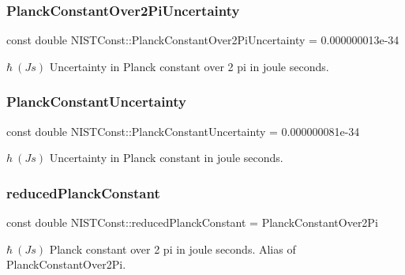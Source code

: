 \subsubsection{\texorpdfstring{Planck\+Constant\+Over2\+Pi\+Uncertainty}{PlanckConstantOver2PiUncertainty}}
{\footnotesize\ttfamily const double N\+I\+S\+T\+Const\+::\+Planck\+Constant\+Over2\+Pi\+Uncertainty = 0.\+000000013e-\/34}

$\hbar \ (J s)$ Uncertainty in Planck constant over 2 pi in joule seconds. \mbox{\label{group___n_i_s_t_const-_planck_constant_gaf490152b8477c6ead134e42e76753f64}} 
\subsubsection{\texorpdfstring{Planck\+Constant\+Uncertainty}{PlanckConstantUncertainty}}
{\footnotesize\ttfamily const double N\+I\+S\+T\+Const\+::\+Planck\+Constant\+Uncertainty = 0.\+000000081e-\/34}

$h \ (J s)$ Uncertainty in Planck constant in joule seconds. \mbox{\label{group___n_i_s_t_const-_planck_constant_ga91e80f15330603015f6f8f8e8f49c926}} 
\subsubsection{\texorpdfstring{reduced\+Planck\+Constant}{reducedPlanckConstant}}
{\footnotesize\ttfamily const double N\+I\+S\+T\+Const\+::reduced\+Planck\+Constant = Planck\+Constant\+Over2\+Pi}

$\hbar \ (J s)$ Planck constant over 2 pi in joule seconds. Alias of Planck\+Constant\+Over2\+Pi. \mbox{\label{group___n_i_s_t_const-_planck_constant_gab9efdc081c1c1a03ca7a233d1589b1d8}} 
